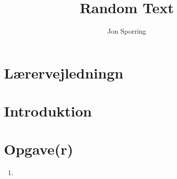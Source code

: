 \documentclass[a4paper,12pt]{article}
\title{Random Text}
\author{Jon Sporring}
\begin{document}
\maketitle

\section{Lærervejledningn}

\section{Introduktion}

\section{Opgave(r)}
\begin{enumerate}
\item 
\end{enumerate}
\end{document}

